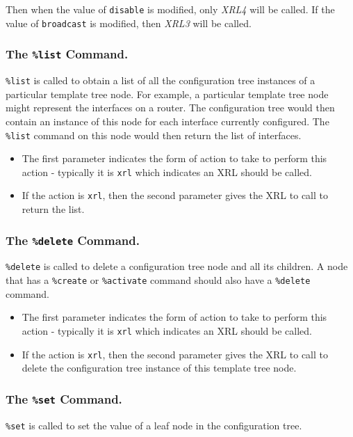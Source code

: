 \documentclass[11pt]{article}
\begin{document}
Then when the value of {\tt disable} is modified, only
{\it XRL4} will be called. If the value of {\tt broadcast} is modified,
then {\it XRL3} will be called.

\subsubsection{The {\tt \%list} Command.}
{\tt \%list} is called to obtain a list of all the configuration tree
instances of a particular template tree node.  For example, a
particular template tree node might represent the interfaces on a
router.  The configuration tree would then contain an instance of this
node for each interface currently configured.  The {\tt \%list}
command on this node would then return the list of interfaces.

\begin{itemize}
  \item The first parameter indicates the form of action to take to perform
this action - typically it is {\tt xrl} which indicates an XRL should
be called.

  \item If the action is {\tt xrl}, then the second parameter gives the XRL to
call to return the list.

\end{itemize}

\subsubsection{The {\tt \%delete} Command.}
{\tt \%delete} is called to delete a configuration tree node and all its
children.  A node that has a {\tt \%create} or {\tt \%activate}
command should also have a {\tt \%delete} command.

\begin{itemize}
  \item The first parameter indicates the form of action to take to perform
this action - typically it is {\tt xrl} which indicates an XRL should
be called.

  \item If the action is {\tt xrl}, then the second parameter gives the XRL to
call to delete the configuration tree instance of this template tree node.

\end{itemize}

\subsubsection{The {\tt \%set} Command.}
{\tt \%set} is called to set the value of a leaf node in the
configuration tree.
\end{document}
